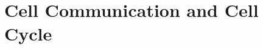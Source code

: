 \documentclass[../bio.tex]{subfiles}
\begin{document}
\chapter{Cell Communication and Cell Cycle}
\end{document}
